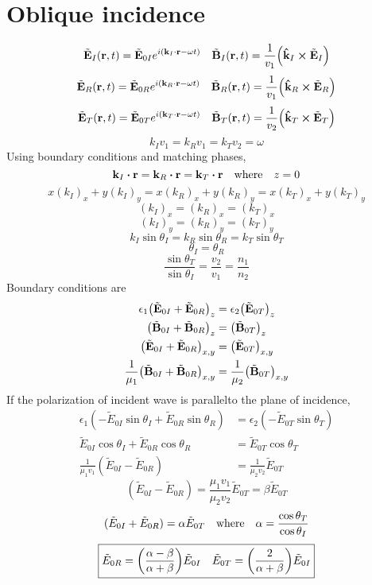 \documentclass[12pt]{article}
\begin{document}
\section*{Oblique incidence}
\[\tilde{\vb{E}}_I(\vb{r},t)=\tilde{\vb{E}}_{0I}e^{i(\vb{k}_I\cdot\vb{r}-\omega t)}\quad \tilde{\vb{B}}_I(\vb{r},t)=\frac{1}{v_1}\qty(\vu{k}_I\cp\tilde{\vb{E}}_I)\]
\[\tilde{\vb{E}}_R(\vb{r},t)=\tilde{\vb{E}}_{0R}e^{i(\vb{k}_R\cdot\vb{r}-\omega t)}\quad \tilde{\vb{B}}_R(\vb{r},t)=\frac{1}{v_1}\qty(\vu{k}_R\cp\tilde{\vb{E}}_R)\]
\[\tilde{\vb{E}}_T(\vb{r},t)=\tilde{\vb{E}}_{0T}e^{i(\vb{k}_T\cdot\vb{r}-\omega t)}\quad \tilde{\vb{B}}_T(\vb{r},t)=\frac{1}{v_2}\qty(\vu{k}_T\cp\tilde{\vb{E}}_T)\]
\[k_Iv_1=k_Rv_1=k_Tv_2=\omega\]
Using boundary conditions and matching phases,
\[\vb{k}_I\vdot\vb{r}=\vb{k}_R\vdot\vb{r}=\vb{k}_T\vdot\vb{r}\qq{where} z=0\]
\[x(k_I)_x+y(k_I)_y=x(k_R)_x+y(k_R)_y=x(k_T)_x+y(k_T)_y\]
\[(k_I)_x=(k_R)_x=(k_T)_x\]
\[(k_I)_y=(k_R)_y=(k_T)_y\]
\[k_I\sin\theta_I=k_R\sin\theta_R=k_T\sin\theta_T\]
\[\theta_I=\theta_R\]
\[\frac{\sin\theta_T}{\sin\theta_I}=\frac{v_2}{v_1}=\frac{n_1}{n_2}\]
Boundary conditions are 
\begin{align*}
\epsilon_1\qty(\tilde{\vb{E}}_{0I}+\tilde{\vb{E}}_{0R})_z&=\epsilon_2\qty(\tilde{\vb{E}}_{0T})_z\\
\qty(\tilde{\vb{B}}_{0I}+\tilde{\vb{B}}_{0R})_z&=\qty(\tilde{\vb{B}}_{0T})_z\\
\qty(\tilde{\vb{E}}_{0I}+\tilde{\vb{E}}_{0R})_{x,y}&=\qty(\tilde{\vb{E}}_{0T})_{x,y}\\
\frac{1}{\mu_1}\qty(\tilde{\vb{B}}_{0I}+\tilde{\vb{B}}_{0R})_{x,y}&=\frac{1}{\mu_2}\qty(\tilde{\vb{B}}_{0T})_{x,y}
\end{align*}
If the polarization of incident wave is parallelto the plane of incidence,
\begin{align*}
\epsilon_1(-\tilde{E}_{0I}\sin\theta_I+\tilde{E}_{0R}\sin\theta_R)&=\epsilon_2(-\tilde{E}_{0T}\sin\theta_T)\\
\tilde{E}_{0I}\cos\theta_I+\tilde{E}_{0R}\cos\theta_R&=
\tilde{E}_{0T}\cos\theta_T\\
\frac{1}{\mu_1v_1}(\tilde{E}_{0I}-\tilde{E}_{0R})&=\frac{1}{\mu_2v_2}\tilde{E}_{0T}
\end{align*}
\[(\tilde{E}_{0I}-\tilde{E}_{0R})=\frac{\mu_1v_1}{\mu_2v_2}\tilde{E}_{0T}=\beta\tilde{E}_{0T}\]
\[(\tilde{E}_{0I}+\tilde{E}_{0R})=\alpha\tilde{E}_{0T}\qq{where}\alpha=\frac{\cos\theta_T}{\cos\theta_I}\]
\[\boxed{\tilde{E}_{0R}=\qty(\frac{\alpha-\beta}{\alpha+\beta})\tilde{E}_{0I}\quad\tilde{E}_{0T}=\qty(\frac{2}{\alpha+\beta})\tilde{E}_{0I}}\]
\end{document}
